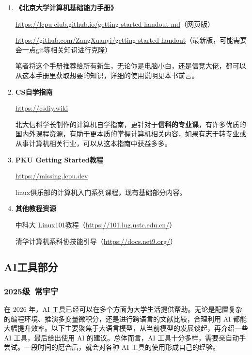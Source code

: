 \documentclass[11pt,oneside]{book}
\begin{document}
\begin{enumerate}
    \item \textbf{《北京大学计算机基础能力手册》}

    \url{https://lcpu-club.github.io/getting-started-handout-md}（网页版）

    \url{https://github.com/ZangXuanyi/getting-started-handout}（最新版，可能需要会一点git等相关知识进行克隆）

    笔者将这个手册推荐给所有新生，无论你是电脑小白，还是信竞大佬，都可以从这本手册里获取想要的知识，详细的使用说明见本书前言。

    \item \textbf{CS自学指南}

    \url{https://csdiy.wiki}

    北大信科学长制作的计算机自学指南，更针对于\textbf{信科的专业课}，有许多优质的国内外课程资源，有助于更本质的掌握计算机相关内容，如果有志于转专业或从事计算机相关行业，可以从这本指南中获益多多。

    \item \textbf{PKU Getting Started教程}

    \url{https://missing.lcpu.dev}

    linux俱乐部的计算机入门系列课程，现有基础部分内容。

    \item \textbf{其他教程资源}

    中科大 Linux101教程（\url{https://101.lug.ustc.edu.cn/}）

    清华计算机系科协技能引导（\url{https://docs.net9.org/}）
\end{enumerate}

\subsection{AI工具部分}

\subsubsection{2025级\ 常宇宁}

在 2026 年，AI 工具已经可以在多个方面为大学生活提供帮助。无论是配置复杂的编程环境、推演多变量微积分，还是进行跨语言的文献比较，合理利用 AI 都能大幅提升效率。以下主要聚焦于大语言模型，从当前模型的发展谈起，再介绍一些 AI 工具，最后给出使用 AI 的建议。总体而言，AI 工具十分多样，需要亲自动手尝试。一段时间的磨合后，就会对各种 AI 工具的使用形成自己的经验。

\vspace{10pt}
\end{document}
